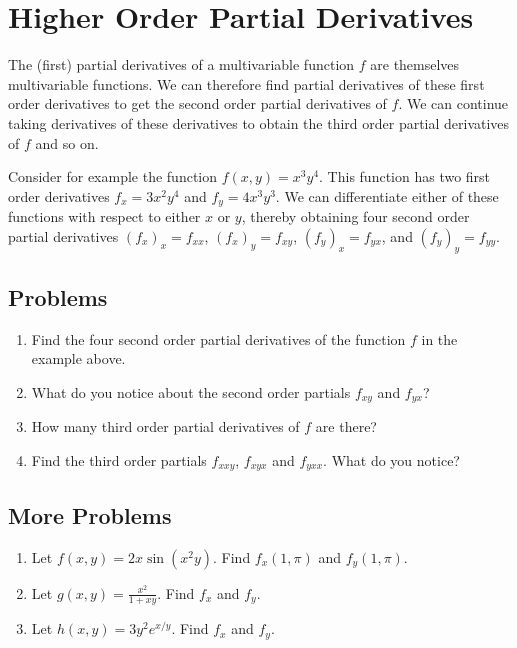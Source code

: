 \documentclass[14pt,letterpaper,fleqn]{article}
\begin{document}
\section*{Higher Order Partial Derivatives}
The (first) partial derivatives of a multivariable function $f$ are themselves multivariable functions. We can therefore find partial derivatives of these first order derivatives to get the second order partial derivatives of $f$. We can continue taking derivatives of these derivatives to obtain the third order partial derivatives of $f$ and so on.

Consider for example the function $f(x,y) = x^3 y^4$. This function has two first order derivatives $f_x = 3x^2 y^4$ and $f_y = 4x^3 y^3$. We can differentiate either of these functions with respect to either $x$ or $y$, thereby obtaining four second order partial derivatives $(f_x)_x = f_{xx}$, $(f_x)_y = f_{xy}$, $(f_y)_x = f_{yx}$, and $(f_y)_y = f_{yy}$.

\subsection*{Problems}
\begin{enumerate}
\item Find the four second order partial derivatives of the function $f$ in the example above.
\item What do you notice about the second order partials $f_{xy}$ and $f_{yx}$?
\item How many third order partial derivatives of $f$ are there?
\item Find the third order partials $f_{xxy}$, $f_{xyx}$ and $f_{yxx}$. What do you notice?
\end{enumerate}
\subsection*{More Problems}
\begin{enumerate}[resume]
  \item Let $f(x,y) = 2x\sin(x^2y)$.  Find $f_x(1,\pi)$ and $f_y(1,\pi)$.
  \item Let $g(x,y) = \frac{x^2}{1 + xy}$. Find $f_x$ and $f_y$.
  \item Let $h(x,y) = 3y^2 e^{x/y}$. Find $f_x$ and $f_y$.
\end{enumerate}
\end{document}

